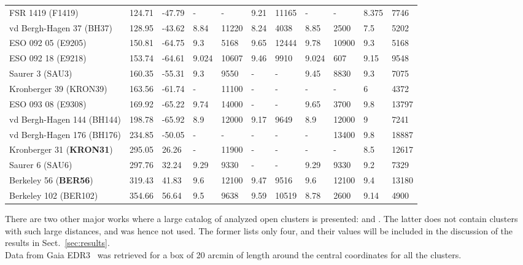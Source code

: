 \documentclass{aa}
\begin{document}
\begin{table}
\begin{tabular}{lllllllllll}
 FSR 1419 (F1419)   & 124.71 & -47.79    & -   & -   & 9.21  & 11165 & -   & -   & 8.375 & 7746  \\
 vd Bergh-Hagen 37 (BH37)    & 128.95 & -43.62    & 8.84  & 11220 & 8.24 
 & 4038  & 8.85  & 2500  & 7.5   & 5202  \\
 ESO 092 05 (E9205)  & 150.81 & -64.75    & 9.3   & 5168  & 9.65  & 12444 &
 9.78  & 10900 & 9.3   & 5168  \\
 ESO 092 18 (E9218)  & 153.74 & -64.61    & 9.024 & 10607 & 9.46  & 9910  &
 9.024 & 607   & 9.15  & 9548  \\
 Saurer 3 (SAU3)   & 160.35 & -55.31    & 9.3   & 9550  & -   & -   & 9.45  &
 8830 & 9.3   & 7075  \\
 Kronberger 39 (KRON39)    & 163.56 & -61.74    & -   & 11100 & -   & -   & -   &
 -   & 6     & 4372  \\
 ESO 093 08 (E9308)  & 169.92 & -65.22    & 9.74  & 14000 & -   & -   & 9.65  &
 3700  & 9.8   & 13797 \\
 vd Bergh-Hagen 144 (BH144)   & 198.78 & -65.92    & 8.9   & 12000 & 9.17
 & 9649  & 8.9   & 12000 & 9     & 7241  \\
 vd Bergh-Hagen 176 (BH176)   & 234.85 & -50.05    & -   & -   & -   & - 
 & -   & 13400 & 9.8   & 18887 \\
 Kronberger 31 (\textbf{KRON31})    & 295.05 & 26.26     & -   & 11900 & -   & -   & -   &
 -   & 8.5   & 12617 \\
 Saurer 6 (SAU6)   & 297.76 & 32.24     & 9.29  & 9330  & -   & -   & 9.29  &
 9330 & 9.2   & 7329  \\
 Berkeley 56 (\textbf{BER56})     & 319.43 & 41.83     & 9.6   & 12100 & 9.47  & 9516  &
 9.6 & 12100 & 9.4   & 13180 \\
 Berkeley 102 (BER102)    & 354.66 & 56.64     & 9.5   & 9638  & 9.59  & 10519 &
 8.78  & 2600  & 9.14  & 4900 \\
 \hline
 \end{tabular}
 \end{table}

 There are two other major works where a large catalog of analyzed open clusters
 is presented: \cite{Lui_2019} and \cite{Dias_2021}. The latter does not contain
 clusters with such large distances, and was hence not used. The former lists
 only four, and their values will be included in the discussion of the results
 in Sect.~\ref{sec:results}.\\

 Data from Gaia EDR3~\citep{Gaia_2016,Gaia_EDR3} was retrieved for a box of 20
 arcmin of length around the central coordinates for all the clusters.
\end{document}
